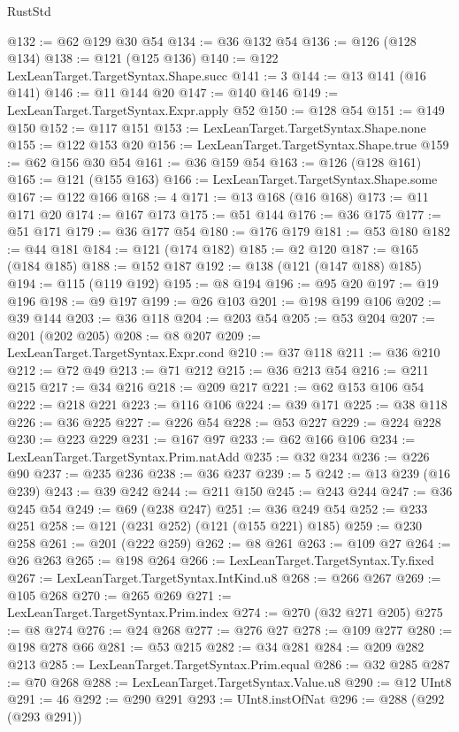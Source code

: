 \begin{lexlean}{RustStd}
\begin{coremodule}
{\begin{coremodule}
{{{{{{{{{{{{{@132 := @62 @129 @30 @54
@134 := @36 @132 @54
@136 := @126 (@128 @134)
@138 := @121 (@125 @136)
@140 := @122 LexLeanTarget.TargetSyntax.Shape.succ
@141 := 3
@144 := @13 @141 (@16 @141)
@146 := @11 @144 @20
@147 := @140 @146
@149 := LexLeanTarget.TargetSyntax.Expr.apply @52
@150 := @128 @54
@151 := @149 @150
@152 := @117 @151
@153 := LexLeanTarget.TargetSyntax.Shape.none
@155 := @122 @153 @20
@156 := LexLeanTarget.TargetSyntax.Shape.true
@159 := @62 @156 @30 @54
@161 := @36 @159 @54
@163 := @126 (@128 @161)
@165 := @121 (@155 @163)
@166 := LexLeanTarget.TargetSyntax.Shape.some
@167 := @122 @166
@168 := 4
@171 := @13 @168 (@16 @168)
@173 := @11 @171 @20
@174 := @167 @173
@175 := @51 @144
@176 := @36 @175
@177 := @51 @171
@179 := @36 @177 @54
@180 := @176 @179
@181 := @53 @180
@182 := @44 @181
@184 := @121 (@174 @182)
@185 := @2 @120
@187 := @165 (@184 @185)
@188 := @152 @187
@192 := @138 (@121 (@147 @188) @185)
@194 := @115 (@119 @192)
@195 := @8 @194
@196 := @95 @20
@197 := @19 @196
@198 := @9 @197
@199 := @26 @103
@201 := @198 @199 @106
@202 := @39 @144
@203 := @36 @118
@204 := @203 @54
@205 := @53 @204
@207 := @201 (@202 @205)
@208 := @8 @207
@209 := LexLeanTarget.TargetSyntax.Expr.cond
@210 := @37 @118
@211 := @36 @210
@212 := @72 @49
@213 := @71 @212
@215 := @36 @213 @54
@216 := @211 @215
@217 := @34 @216
@218 := @209 @217
@221 := @62 @153 @106 @54
@222 := @218 @221
@223 := @116 @106
@224 := @39 @171
@225 := @38 @118
@226 := @36 @225
@227 := @226 @54
@228 := @53 @227
@229 := @224 @228
@230 := @223 @229
@231 := @167 @97
@233 := @62 @166 @106
@234 := LexLeanTarget.TargetSyntax.Prim.natAdd
@235 := @32 @234
@236 := @226 @90
@237 := @235 @236
@238 := @36 @237
@239 := 5
@242 := @13 @239 (@16 @239)
@243 := @39 @242
@244 := @211 @150
@245 := @243 @244
@247 := @36 @245 @54
@249 := @69 (@238 @247)
@251 := @36 @249 @54
@252 := @233 @251
@258 := @121 (@231 @252) (@121 (@155 @221) @185)
@259 := @230 @258
@261 := @201 (@222 @259)
@262 := @8 @261
@263 := @109 @27
@264 := @26 @263
@265 := @198 @264
@266 := LexLeanTarget.TargetSyntax.Ty.fixed
@267 := LexLeanTarget.TargetSyntax.IntKind.u8
@268 := @266 @267
@269 := @105 @268
@270 := @265 @269
@271 := LexLeanTarget.TargetSyntax.Prim.index
@274 := @270 (@32 @271 @205)
@275 := @8 @274
@276 := @24 @268
@277 := @276 @27
@278 := @109 @277
@280 := @198 @278 @66
@281 := @53 @215
@282 := @34 @281
@284 := @209 @282 @213
@285 := LexLeanTarget.TargetSyntax.Prim.equal
@286 := @32 @285
@287 := @70 @268
@288 := LexLeanTarget.TargetSyntax.Value.u8
@290 := @12 UInt8
@291 := 46
@292 := @290 @291
@293 := UInt8.instOfNat
@296 := @288 (@292 (@293 @291))
}}}}}}}}}}}}}
\end{coremodule}}
\end{coremodule}
\end{lexlean}
